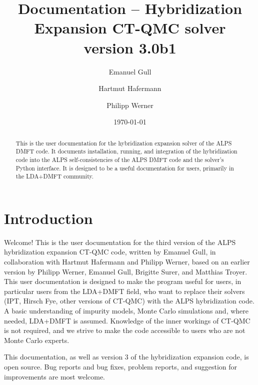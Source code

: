 \documentclass[aps,prb,floatfix,superscriptaddress,twocolumn,notitlepage]{revtex4-1}
\begin{document}
\newcommand{\Emanuel}{\href{mailto:gull@pks.mpg.de}{Emanuel }}
\title{Documentation -- Hybridization Expansion CT-QMC solver\\ version 3.0b1}
\author{Emanuel Gull}
\author{Hartmut Hafermann}
\author{Philipp Werner}
\date{\today }

\begin{abstract}
This is the user documentation for the hybridization expansion solver of the ALPS DMFT code. It documents installation, running, and integration of the hybridization code into the ALPS self-consistencies of the ALPS DMFT code and the solver's Python interface. It is designed to be a useful documentation for users, primarily in the LDA+DMFT community.
\end{abstract}

\maketitle

\section{Introduction}
Welcome! This is the user documentation for the third version of the ALPS\cite{ALPS20} hybridization expansion\cite{Werner06} CT-QMC\cite{CPC_CTHYB} code, written by Emanuel Gull, in collaboration with Hartmut Hafermann and Philipp Werner, based on an earlier version\cite{ALPS_DMFT} by Philipp Werner, Emanuel Gull, Brigitte Surer, and Matthias Troyer. This user documentation is designed to make the program useful for users, in particular users from the LDA+DMFT field, who want to replace their solvers (IPT, Hirsch Fye, other versions of CT-QMC) with the ALPS hybridization code. A basic understanding of impurity models, Monte Carlo simulations and, where needed, LDA+DMFT is assumed. Knowledge of the inner workings of CT-QMC is not required, and we strive to make the code accessible to users who are not Monte Carlo experts.

This documentation, as well as version $3$ of the hybridization expansion code, is open source. Bug reports and bug fixes, problem reports, and suggestion for improvements are most welcome.
\end{document}
